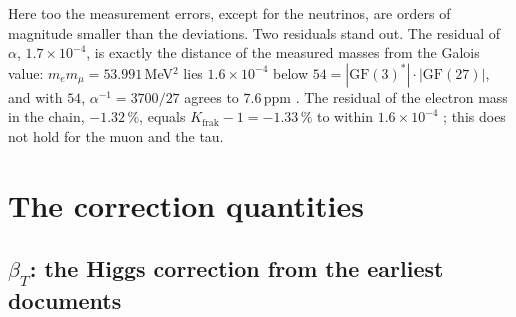 Here too the measurement errors, except for the neutrinos, are orders of magnitude smaller than the
deviations. Two residuals stand out. The residual of $\alpha$, $1.7\times10^{-4}$, is exactly the
distance of the measured masses from the Galois value: $m_em_\mu=53.991$\,MeV$^2$ lies
$1.6\times10^{-4}$ below $54=|\mathrm{GF}(3)^*|\cdot|\mathrm{GF}(27)|$, and with $54$,
$\alpha^{-1}=3700/27$ agrees to $7.6$\,ppm \KM. The residual of the electron mass in the chain,
$-1.32\,\%$, equals $K_{\text{frak}}-1=-1.33\,\%$ to within $1.6\times10^{-4}$ \KM; this does not
hold for the muon and the tau.

\section{The correction quantities}

\subsection{\texorpdfstring{$\beta_T$}{beta\_T}: the Higgs correction from the earliest documents}

